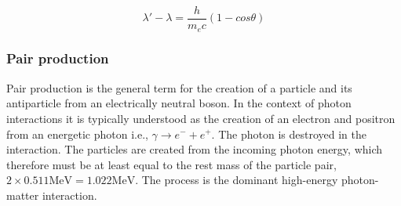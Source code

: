 \begin{equation}
  \label{eq:compton_scattering}
  \lambda' - \lambda = \frac{h}{m_{e}c}(1-cos\theta)
\end{equation}

\subsubsection{Pair production}
Pair production is the general term for the creation of a particle and its antiparticle from an electrically neutral boson. In the context of photon interactions it is typically understood as the creation of an electron and positron from an energetic photon i.e., $\gamma \rightarrow e^- + e^+$. The photon is destroyed in the interaction. The particles are created from the incoming photon energy, which therefore must be at least equal to the rest mass of the particle pair, $2 \times 0.511 \mathrm{MeV} = 1.022 \mathrm{MeV}$. The process is the dominant high-energy photon-matter interaction. 


